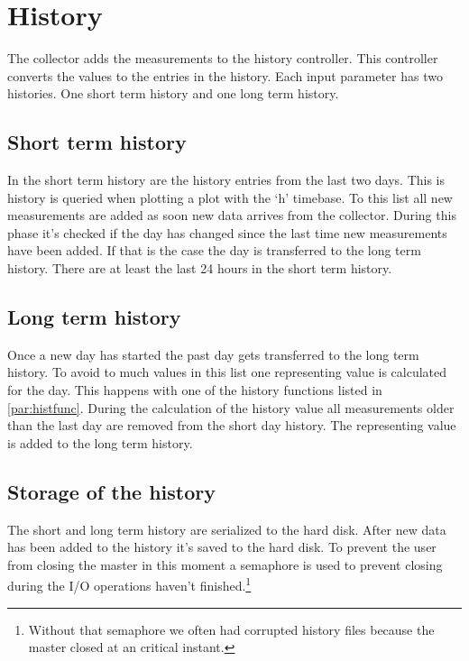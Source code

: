 
\section{History} %
\label{sec:history}
The collector adds the measurements to the history controller. This controller converts the values to the entries in the history. Each input parameter has two histories. One short term history and one long term history. 
\subsection{Short term history} %
\label{sub:short_term_history}
In the short term history are the history entries from the last two days. This is history is queried when plotting a plot with the `h' timebase. To this list all new measurements are added as soon new data arrives from the collector. During this phase it's checked if the day has changed since the last time new measurements have been added. If that is the case the day is transferred to the long term history. There are at least the last 24 hours in the short term history.

\subsection{Long term history} %
\label{ssub:long_term_history}
Once a new day has started the past day gets transferred to the long term history. To avoid to much values in this list one representing value is calculated for the day. This happens with one of the history functions listed in \ref{par:histfunc}. During the calculation of the history value all measurements older than the last day are removed from the short day history. The representing value is added to the long term history.

\subsection{Storage of the history} %
\label{sub:storage_of_the_history}
The short and long term history are serialized to the hard disk. After new data has been added to the history it's saved to the hard disk. To prevent the user from closing the master in this moment a semaphore is used to prevent closing during the I/O operations haven't finished.\footnote{Without that semaphore we often had corrupted history files because the master closed at an critical instant.}

